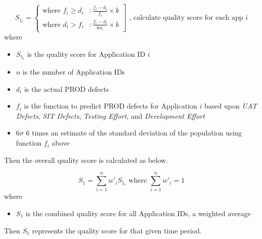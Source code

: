 \documentclass[SDSUThesis.tex]{subfiles}
\begin{document}
                \begin{displaymath}
                   S_{1_i} = \left\{
                     \begin{array}{lr}
                       \text{where } f_i \geq d_i & :  \frac{f_i - d_i}{f_i} \times k  \\
                       \text{where } d_i > f_i  & : \frac{f_i-d_i }{6\sigma_i} \times k
                     \end{array}
                   \right] \text{   , calculate quality score for each app $i$}
                \end{displaymath} 
                where
                \begin{itemize}
                    \item $S_{1_i}$ is the quality score for Application ID $i$
                    \item $n$ is the number of Application IDs
                    \item $d_i$ is the actual PROD defects
                    \item $f_i$ is the function to predict PROD defects for Application $i$ based upon 
                        \textit{UAT Defects}, \textit{SIT Defects}, \textit{Testing Effort}, 
                        and \textit{Development Effort}
                    \item $6\sigma$ 6 times an estimate of the standard deviation of the 
                        population using function $f_i$ above
                \end{itemize}
                
                Then the overall quality score is calculated as below.
                
                \[
                    S_{1} = \sum\limits^n_{i=1} w'_i S_{1_i} \text{ where } \sum\limits^n_{i=1} w'_i = 1
                \]
                where
                \begin{itemize}
                    \item $S_1$ is the combined quality score for all Application IDs, 
                    a weighted average
                \end{itemize}
                
                Then $S_1$ represents the quality score for that given time period.
        
\end{document}
